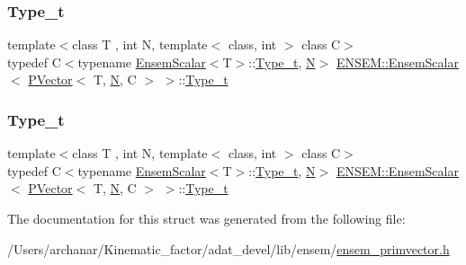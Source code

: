 \subsubsection{\texorpdfstring{Type\_t}{Type\_t}\hspace{0.1cm}{\footnotesize\ttfamily [1/2]}}
{\footnotesize\ttfamily template$<$class T , int N, template$<$ class, int $>$ class C$>$ \\
typedef C$<$typename \mbox{\hyperlink{structENSEM_1_1EnsemScalar}{Ensem\+Scalar}}$<$T$>$\+::\mbox{\hyperlink{structENSEM_1_1EnsemScalar_3_01PVector_3_01T_00_01N_00_01C_01_4_01_4_a7301e4986b6b626a7c41055ad178ffac}{Type\+\_\+t}}, \mbox{\hyperlink{operator__name__util_8cc_a7722c8ecbb62d99aee7ce68b1752f337}{N}}$>$ \mbox{\hyperlink{structENSEM_1_1EnsemScalar}{E\+N\+S\+E\+M\+::\+Ensem\+Scalar}}$<$ \mbox{\hyperlink{classENSEM_1_1PVector}{P\+Vector}}$<$ T, \mbox{\hyperlink{operator__name__util_8cc_a7722c8ecbb62d99aee7ce68b1752f337}{N}}, C $>$ $>$\+::\mbox{\hyperlink{structENSEM_1_1EnsemScalar_3_01PVector_3_01T_00_01N_00_01C_01_4_01_4_a7301e4986b6b626a7c41055ad178ffac}{Type\+\_\+t}}}

\mbox{\label{structENSEM_1_1EnsemScalar_3_01PVector_3_01T_00_01N_00_01C_01_4_01_4_a7301e4986b6b626a7c41055ad178ffac}} 
\subsubsection{\texorpdfstring{Type\_t}{Type\_t}\hspace{0.1cm}{\footnotesize\ttfamily [2/2]}}
{\footnotesize\ttfamily template$<$class T , int N, template$<$ class, int $>$ class C$>$ \\
typedef C$<$typename \mbox{\hyperlink{structENSEM_1_1EnsemScalar}{Ensem\+Scalar}}$<$T$>$\+::\mbox{\hyperlink{structENSEM_1_1EnsemScalar_3_01PVector_3_01T_00_01N_00_01C_01_4_01_4_a7301e4986b6b626a7c41055ad178ffac}{Type\+\_\+t}}, \mbox{\hyperlink{operator__name__util_8cc_a7722c8ecbb62d99aee7ce68b1752f337}{N}}$>$ \mbox{\hyperlink{structENSEM_1_1EnsemScalar}{E\+N\+S\+E\+M\+::\+Ensem\+Scalar}}$<$ \mbox{\hyperlink{classENSEM_1_1PVector}{P\+Vector}}$<$ T, \mbox{\hyperlink{operator__name__util_8cc_a7722c8ecbb62d99aee7ce68b1752f337}{N}}, C $>$ $>$\+::\mbox{\hyperlink{structENSEM_1_1EnsemScalar_3_01PVector_3_01T_00_01N_00_01C_01_4_01_4_a7301e4986b6b626a7c41055ad178ffac}{Type\+\_\+t}}}



The documentation for this struct was generated from the following file\+:\begin{DoxyCompactItemize}
\item 
/\+Users/archanar/\+Kinematic\+\_\+factor/adat\+\_\+devel/lib/ensem/\mbox{\hyperlink{lib_2ensem_2ensem__primvector_8h}{ensem\+\_\+primvector.\+h}}\end{DoxyCompactItemize}
